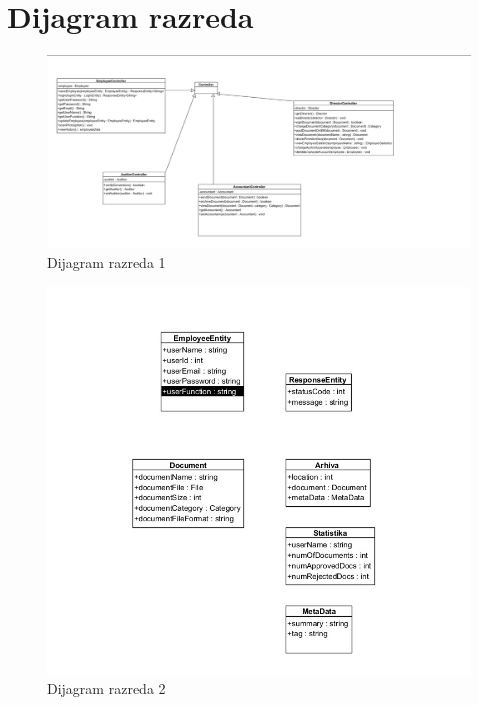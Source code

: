 				
			
			\eject
			
			
		\section{Dijagram razreda}
		
			\begin{figure}[H]
				\includegraphics[scale=0.5]{slike/dijagram_razred1.jpeg} %
				\centering
				\caption{Dijagram razreda 1}
				\label{fig:promjene}
			\end{figure}
			
			\begin{figure}[H]
				\includegraphics[scale=0.5]{slike/dijagram_razred2.jpeg} %
				\centering
				\caption{Dijagram razreda 2}
				\label{fig:promjene}
			\end{figure}
			

